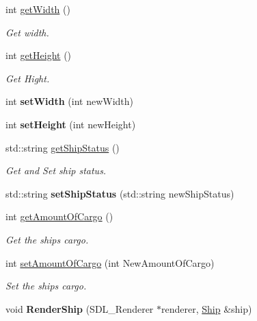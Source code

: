 \begin{DoxyCompactItemize}
\mbox{\label{class_ship_aeba3adb876e7c83760448245f6950d8b}} 
int \hyperlink{class_ship_aeba3adb876e7c83760448245f6950d8b}{get\+Width} ()
\begin{DoxyCompactList}\small\item\em Get width. \end{DoxyCompactList}\item 
\mbox{\label{class_ship_aa776da1fa8f5fd12019ec0030ae138c0}} 
int \hyperlink{class_ship_aa776da1fa8f5fd12019ec0030ae138c0}{get\+Height} ()
\begin{DoxyCompactList}\small\item\em Get Hight. \end{DoxyCompactList}\item 
\mbox{\label{class_ship_ab9524ec89dd6cd0e25974b36143cf86a}} 
int {\bfseries set\+Width} (int new\+Width)
\item 
\mbox{\label{class_ship_a20709bf79b466043ccb120c20af894b1}} 
int {\bfseries set\+Height} (int new\+Height)
\item 
\mbox{\label{class_ship_af91376e255cbd3d1654b9759821f4a06}} 
std\+::string \hyperlink{class_ship_af91376e255cbd3d1654b9759821f4a06}{get\+Ship\+Status} ()
\begin{DoxyCompactList}\small\item\em Get and Set ship status. \end{DoxyCompactList}\item 
\mbox{\label{class_ship_a733169da5bc3c07603f1ea35c0bb5889}} 
std\+::string {\bfseries set\+Ship\+Status} (std\+::string new\+Ship\+Status)
\item 
\mbox{\label{class_ship_a639f56a1c08568f30a15e26a767fe855}} 
int \hyperlink{class_ship_a639f56a1c08568f30a15e26a767fe855}{get\+Amount\+Of\+Cargo} ()
\begin{DoxyCompactList}\small\item\em Get the ships cargo. \end{DoxyCompactList}\item 
\mbox{\label{class_ship_aabc3adc1bd83da7022bbfb8e5bc06757}} 
int \hyperlink{class_ship_aabc3adc1bd83da7022bbfb8e5bc06757}{set\+Amount\+Of\+Cargo} (int New\+Amount\+Of\+Cargo)
\begin{DoxyCompactList}\small\item\em Set the ships cargo. \end{DoxyCompactList}\item 
\mbox{\label{class_ship_a3ed6ad81c7733204557276a176cb8621}} 
void {\bfseries Render\+Ship} (S\+D\+L\+\_\+\+Renderer $\ast$renderer, \hyperlink{class_ship}{Ship} \&ship)
\end{DoxyCompactItemize}

